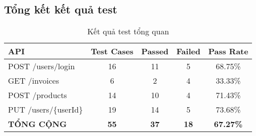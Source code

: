 \documentclass[12pt,a4paper]{article}
\begin{document}
\subsection{Tổng kết kết quả test}

\begin{table}[H]
\centering
\begin{tabular}{|l|c|c|c|c|}
\hline
\textbf{API} & \textbf{Test Cases} & \textbf{Passed} & \textbf{Failed} & \textbf{Pass Rate} \\
\hline
POST /users/login & 16 & 11 & 5 & 68.75\% \\
\hline
GET /invoices & 6 & 2 & 4 & 33.33\% \\
\hline
POST /products & 14 & 10 & 4 & 71.43\% \\
\hline
PUT /users/\{userId\} & 19 & 14 & 5 & 73.68\% \\
\hline
\textbf{TỔNG CỘNG} & \textbf{55} & \textbf{37} & \textbf{18} & \textbf{67.27\%} \\
\hline
\end{tabular}
\caption{Kết quả test tổng quan}
\end{table}
\end{document}
